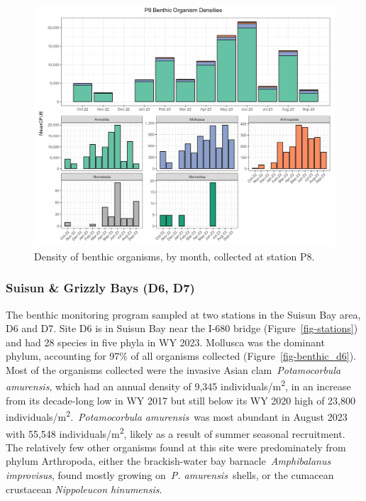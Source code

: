 \documentclass[
]{article}
\begin{document}
\begin{figure}

{\centering \includegraphics[width=9.84in,height=\textheight]{../figures/benthic_bar_p8.jpg}

}

\caption{\label{fig-benthic_p8}Density of benthic organisms, by month,
collected at station P8.}

\end{figure}

\hypertarget{suisun-grizzly-bays-d6-d7}{%
\subsubsection{Suisun \& Grizzly Bays (D6,
D7)}\label{suisun-grizzly-bays-d6-d7}}

The benthic monitoring program sampled at two stations in the Suisun Bay
area, D6 and D7. Site D6 is in Suisun Bay near the I-680 bridge
(Figure~\ref{fig-stations}) and had 28 species in five phyla in WY 2023.
Mollusca was the dominant phylum, accounting for 97\% of all organisms
collected (Figure~\ref{fig-benthic_d6}). Most of the organisms collected
were the invasive Asian clam~\emph{Potamocorbula amurensis}, which had
an annual density of 9,345 individuals/m\textsuperscript{2}, in an
increase from its decade-long low in WY 2017 but still below its WY 2020
high of 23,800 individuals/m\textsuperscript{2}.~\emph{Potamocorbula
amurensis}~was most abundant in August 2023 with 55,548
individuals/m\textsuperscript{2}, likely as a result of summer seasonal
recruitment. The relatively few other organisms found at this site were
predominately from phylum Arthropoda, either the brackish-water bay
barnacle~\emph{Amphibalanus improvisus}, found mostly growing
on~\emph{P. amurensis}~shells, or the cumacean crustacean
\emph{Nippoleucon hinumensis}.
\end{document}
